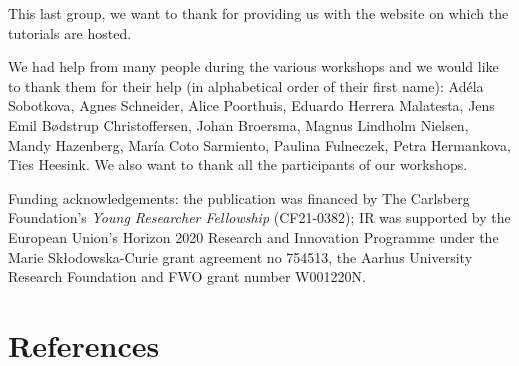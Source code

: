 \documentclass[
]{article}
\begin{document}
This last group, we want to thank for providing us with the website on which the tutorials are hosted.

We had help from many people during the various workshops and we would like to thank them for their help (in alphabetical order of their first name): Adéla Sobotkova, Agnes Schneider, Alice Poorthuis, Eduardo Herrera Malatesta, Jens Emil Bødstrup Christoffersen, Johan Broersma, Magnus Lindholm Nielsen, Mandy Hazenberg, María Coto Sarmiento, Paulina Fulneczek, Petra Hermankova, Ties Heesink. We also want to thank all the participants of our workshops.

Funding acknowledgements: the publication was financed by The Carlsberg Foundation's \emph{Young Researcher Fellowship} (CF21-0382); IR was supported by the European Union's Horizon 2020 Research and Innovation Programme under the Marie Skłodowska-Curie grant agreement no 754513, the Aarhus University Research Foundation and FWO grant number W001220N.

\hypertarget{references}{%
\section*{References}\label{references}}
\end{document}
